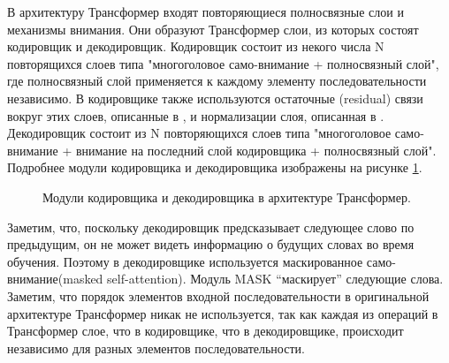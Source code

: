 В архитектуру Трансформер входят повторяющиеся полносвязные слои и механизмы внимания. Они образуют Трансформер слои, из которых состоят кодировщик и декодировщик. Кодировщик состоит из некого числа N повторящихся слоев типа "многоголовое само-внимание + полносвязный слой", где полносвязный слой применяется к каждому элементу последовательности независимо. В кодировщике также используются остаточные (residual) связи вокруг этих слоев, описанные в \cite{he_2016}, и нормализации слоя, описанная в \cite{ba_2016}.
Декодировщик состоит из N повторяющихся слоев типа "многоголовое само-внимание + внимание на последний слой кодировщика + полносвязный слой". 
 Подробнее модули кодировщика и декодировщика изображены на рисунке \ref{fig:Transformer4-EncoderDecoder}. 

\begin{figure}[ht]
  \caption{Модули кодировщика и декодировщика в архитектуре Трансформер.}\label{fig:Transformer4-EncoderDecoder}
\end{figure}


 Заметим, что, поскольку декодировщик предсказывает следующее слово по предыдущим, он не может видеть информацию о будущих словах во время обучения. Поэтому в декодировщике используется маскированное само-внимание(masked self-attention). Модуль MASK “маскирует” следующие слова.
Заметим, что порядок элементов входной последовательности в оригинальной архитектуре Трансформер никак не используется, так как каждая из операций в Трансформер слое, что в кодировщике, что в декодировщике, происходит независимо для разных элементов последовательности. 

